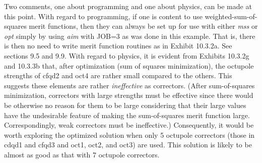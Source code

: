 Two comments, one about programming and one about physics, can be made at
this point.  With regard to programming, if one is content to use
weighted-sum-of-squares merit functions, then they can always be set up
for use with either {\em mss} or {\em opt} simply by using {\em aim} with
JOB=3 as was done in this example.  That is, there is then no need to
write merit function
routines as in Exhibit 10.3.2a.  See sections 9.5 and 9.9.  With regard
to physics, it is evident from Exhibits 10.3.2g and 10.3.3b that, after
optimization (sum of squares minimization), the octupole strengths of
cfqd2 and oct4 are rather small compared to the others.  This suggests
these elements are rather {\em ineffective} as correctors.  (After sum-of-squares
minimization, correctors with large strengths must be effective since
there would be otherwise no reason for them to be large considering that
their large values have the undesirable feature of making the
sum-of-squares merit function large.  Correspondingly, weak correctors
must be ineffective.)  Consequently, it would be worth exploring the
optimized solution when only 5 octupole correctors (those in cdqd1 and
cfqd3 and oct1, oct2, and oct3) are used.  This solution is likely to be
almost as good as that with 7 octupole correctors.

